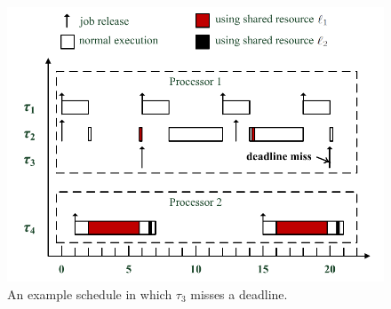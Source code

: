\begin{figure}[!ht]
\begin{center}
\includegraphics[width=12cm]{Counterexample}
\caption{An example schedule in which $\tau_3$ misses a deadline. 
}
\label{fig:counterexample_protocol}
\end{center}
\end{figure}
